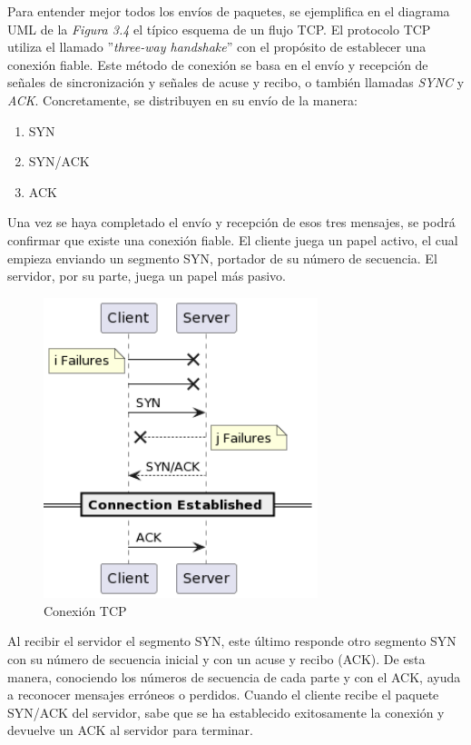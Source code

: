 \documentclass[a4paper,11pt]{book}
\begin{document}
 Para entender mejor todos los envíos de paquetes, se ejemplifica en el diagrama UML de la \textit{Figura 3.4} el típico esquema de un flujo TCP. El protocolo TCP utiliza el llamado ''\textit{three-way handshake}'' con el propósito de establecer una conexión fiable. Este método de conexión se basa en el envío y recepción de señales de sincronización y señales de acuse y recibo, o también llamadas \textit{SYNC} y \textit{ACK}. Concretamente, se distribuyen en su envío de la manera:
 \begin{enumerate}
 \item SYN
 \item SYN/ACK
 \item ACK
 \end{enumerate}
Una vez se haya completado el envío y recepción de esos tres mensajes, se podrá confirmar que existe una conexión fiable. El cliente juega un papel activo, el cual empieza enviando un segmento SYN, portador de su número de secuencia. El servidor, por su parte, juega un papel más pasivo.

\begin{figure}[hbtp]
\centering
\includegraphics[width = 8cm]{FIGURAS/TCP_flow.png}
\caption{Conexión TCP}
\end{figure}


Al recibir el servidor el segmento SYN, este último responde otro segmento SYN con su número de secuencia inicial y con un acuse y recibo (ACK). De esta manera, conociendo los números de secuencia de cada parte y con el ACK, ayuda a reconocer mensajes erróneos o perdidos. Cuando el cliente recibe el paquete SYN/ACK del servidor, sabe que se ha establecido exitosamente la conexión y devuelve un ACK al servidor para terminar.
\end{document}
